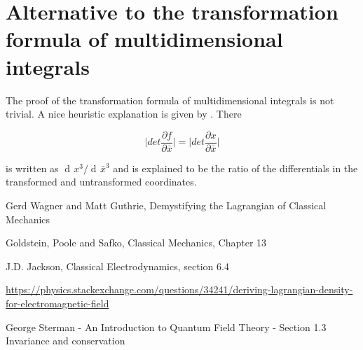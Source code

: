 \documentclass{article}
\DeclareMathOperator{\dd}{d\!}
\begin{document}
\section{Alternative to the transformation formula of multidimensional integrals} \label{TranformationFormula}

The proof of the transformation formula of multidimensional integrals is not trivial. 
A nice heuristic explanation is given by \cite{Sterman}. There

\begin{equation}
\bigg|det \frac{\partial f}{\partial \bar{x}} \bigg| =  \bigg|det \frac{\partial x}{\partial \bar{x}} \bigg|
\end{equation}

is written as $\dd x^3 / \dd \bar{x}^3$ and is explained to be the ratio of the differentials in the transformed and untransformed coordinates.


\begin{thebibliography}{9}

 Gerd Wagner and Matt Guthrie, Demystifying the Lagrangian of Classical Mechanics

 Goldstein, Poole and Safko, Classical Mechanics, Chapter 13 

 J.D. Jackson, Classical Electrodynamics, section 6.4

 \url{https://physics.stackexchange.com/questions/34241/deriving-lagrangian-density-for-electromagnetic-field}

 George Sterman - An Introduction to Quantum Field Theory - Section 1.3 Invariance and conservation


\end{thebibliography}
\end{document}
